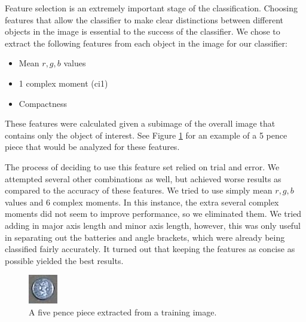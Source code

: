 \documentclass[12pt]{article}
\begin{document}
Feature selection is an extremely important stage of the classification. Choosing features that allow the classifier to make clear distinctions between different objects in the image is essential to the success of the classifier. We chose to extract the following features from each object in the image for our classifier:

\begin{itemize}
	\item Mean $r,g,b$ values
	\item 1 complex moment (ci1)
	\item Compactness
\end{itemize}

These features were calculated given a subimage of the overall image that contains only the object of interest. See Figure \ref{fig:5pencesub} for an example of a 5 pence piece that would be analyzed for these features.

The process of deciding to use this feature set relied on trial and error. We attempted several other combinations as well, but achieved worse results as compared to the accuracy of these features. We tried to use simply mean $r,g,b$ values and 6 complex moments. In this instance, the extra several complex moments did not seem to improve performance, so we eliminated them. We tried adding in major axis length and minor axis length, however, this was only useful in separating out the batteries and angle brackets, which were already being classified fairly accurately. It turned out that keeping the features as concise as possible yielded the best results.

\begin{figure}
	\centering
	\includegraphics[width=0.5\linewidth]{subimage}
	\caption{A five pence piece extracted from a training image.}
	\label{fig:5pencesub}
\end{figure}
\end{document}
